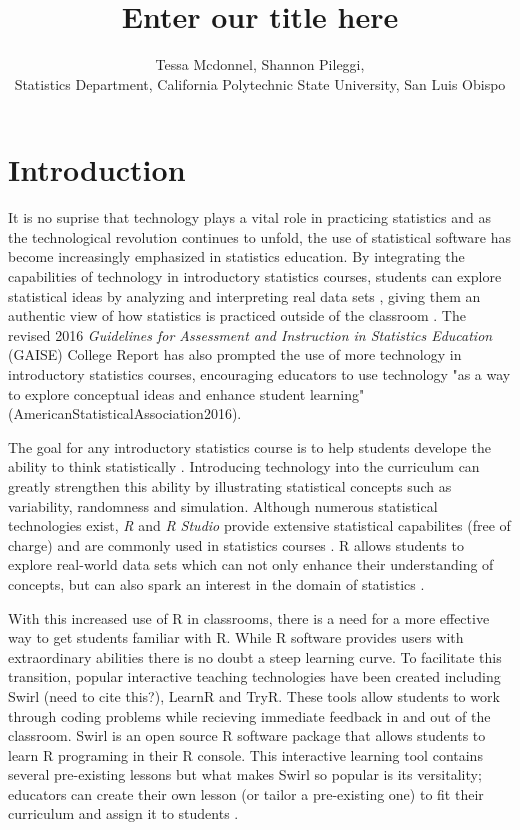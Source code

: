 \documentclass{tise_style}
\title{Enter our title here}
\author{Tessa Mcdonnel, Shannon Pileggi,  \\Statistics Department, California Polytechnic State University, San Luis Obispo}
\begin{document}
\section{Introduction}

It is no suprise that technology plays a vital role in practicing statistics and as the technological revolution continues to 
unfold, the use of statistical software has become increasingly emphasized in statistics education. By integrating the 
capabilities of technology in introductory statistics courses, students can explore statistical ideas by analyzing and 
interpreting real data sets \citep{Chance2007}, giving them an authentic view of how statistics is practiced outside of the 
classroom \citep{Wang2017}. The revised 2016 \textit{Guidelines for Assessment and Instruction in Statistics Education} 
(GAISE) College Report has also prompted the use of more technology in introductory statistics courses, encouraging educators 
to use technology "as a way to explore conceptual ideas and enhance student learning" (AmericanStatisticalAssociation2016).

The goal for any introductory statistics course is to help students develope the ability to think statistically 
\citep{AmericanStatisticalAssociation2016}. 
Introducing technology into the curriculum can greatly strengthen this ability by illustrating statistical concepts such as
variability, randomness and simulation. Although numerous statistical technologies exist, \textit{R} and \textit{R Studio} 
provide extensive statistical capabilites (free of charge) and are commonly used in statistics courses \citep{Chance2007}. R 
allows students to explore real-world data sets which can not only enhance their understanding of concepts, but can also spark
an interest in the domain of statistics \citep{Wang2017}.

With this increased use of R in classrooms, there is a need for a more effective way to get students familiar with R. While R
software provides users with extraordinary abilities there is no doubt a steep learning curve. To facilitate this transition,
popular interactive teaching technologies have been created including Swirl (need to cite this?), LearnR and TryR. These tools 
allow students to work through coding problems while recieving immediate feedback in and out of the classroom. Swirl is an 
open source R software package that allows students to learn R programing in their R console. This interactive learning tool contains several pre-existing lessons but what makes Swirl so popular is its versitality; educators can create their own 
lesson (or tailor a pre-existing one) to fit their curriculum and assign it to students \citep{Carchedi2014}. 
\end{document}
